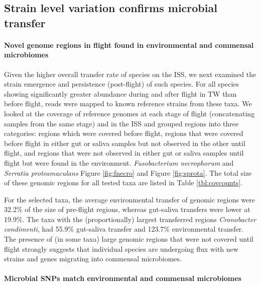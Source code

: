\subsection{Strain level variation confirms microbial transfer}



\paragraph{Novel genome regions in flight found in environmental and commensal microbiomes}

Given the higher overall transfer rate of species on the ISS, we next examined the strain emergence and persistence (post-flight) of such species. For all species showing significantly greater abundance during and after flight in TW than before flight,  reads were mapped to known reference strains from these taxa. We looked at the coverage of reference genomes at each stage of flight (concatenating samples from the same stage) and in the ISS and grouped regions into three categories: regions which were covered before flight, regions that were covered before flight in either gut or saliva samples but not observed in the other until flight, and regions that were not observed in either gut or saliva samples until flight but were found in the environment. \textit{Fusobacterium necrophorum}  and \textit{Serratia proteamaculans} Figure \ref{fig:fnecro} and Figure \ref{fig:sprota}. The total size of these genomic regions for all tested taxa are listed in  Table \ref{tbl:covcounts}.

For the selected taxa, the average environmental transfer of genomic regions were 32.2\% of the size of pre-flight regions, whereas gut-saliva transfers were lower at 19.9\%. The taxa with the (proportionally) largest transferred regions \textit{Cronobacter condimenti}, had 55.9\% gut-saliva transfer and 123.7\% environmental transfer. The presence of (in some taxa) large genomic regions that were not covered until flight strongly suggests that individual species are undergoing flux with new strains and genes migrating into commensal microbiomes. 

\paragraph{Microbial SNPs match environmental and commensal microbiomes}



